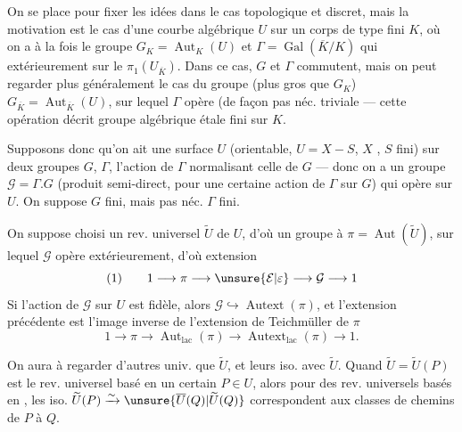 On se place  pour fixer les idées dans le cas
topologique et discret, mais la motivation est
le cas d'une courbe algébrique $U$ sur un
corps de type fini $K$, où on a à la fois
le groupe $G_K=\operatorname{Aut}_K(U)$ et $\Gamma=\operatorname{Gal}(\overline K/K)$
qui  extérieurement sur le $\pi_1(U_{\overline K})$.
Dans ce cas, $G$ et $\Gamma$ commutent, mais
on peut regarder plus généralement le cas
du groupe (plus gros que $G_K$) $G_{\overline K}=\operatorname{Aut}_{\overline K}(U)$,
sur lequel $\Gamma$ opère (de façon pas néc. triviale
--- cette opération décrit  groupe algébrique
étale fini sur $K$.

Supposons donc qu'on ait une surface
$U$ (orientable, $U=X-S$, $X$  , $S$ fini)
sur   deux groupes $G$, $\Gamma$,
l'action de $\Gamma$ normalisant celle de $G$
--- donc on a un groupe $\mathcal G=\Gamma . G$ (produit
semi-direct, pour une certaine action de $\Gamma$
sur $G$) qui opère sur $U$. On suppose $G$
fini, mais pas néc. $\Gamma$ fini.

On suppose choisi un rev. universel $\widetilde U$ de $U$, d'où un groupe à  $\pi=\operatorname{Aut}(\widetilde U)$, sur lequel $\mathcal G$ opère extérieurement, d'où extension
\[
(1)\qquad 1\longrightarrow\pi\longrightarrow\unsure{\mathcal E|\varepsilon}\longrightarrow\mathcal G\longrightarrow 1
\]
Si l'action de $\mathcal G$ sur $U$  est fidèle,
alors $\mathcal G\hookrightarrow\operatorname{Autext}(\pi)$, et l'extension précédente est l'image inverse de l'extension de Teichmüller de $\pi$
\[
1\longrightarrow\pi\longrightarrow\operatorname{Aut}_{\mathrm{lac}}(\pi)\longrightarrow\operatorname{Autext}_{\mathrm{lac}}(\pi)\longrightarrow 1.
\]

 On aura à regarder d'autres  univ. que $\widetilde U$, et leurs iso. avec $\widetilde U$.
Quand $\widetilde U=\widetilde U(P)$ est le rev. universel basé en un certain $P\in U$, alors pour des rev. universels  basés en   ,
les iso. $\widetilde U(P)\xrightarrow{\sim}\unsure{\overline U(Q)|\widetilde U(Q)}$ correspondent  aux classes de chemins de $P$ à $Q$.

